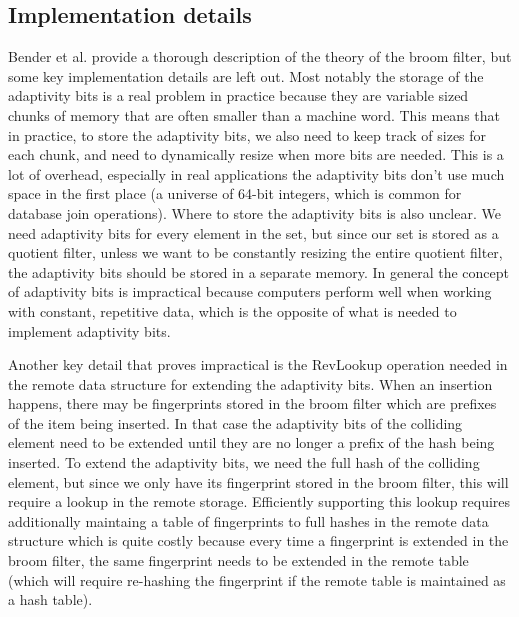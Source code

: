 \documentclass[../paper.tex]{subfiles}
\begin{document}
\subsection{Implementation details}

Bender et al. \cite{broom-filter} provide a thorough description of the theory of
the broom filter, but some key implementation details are left out.
Most notably the storage of the adaptivity bits is a real problem
in practice because they are variable sized chunks of memory that
are often smaller than a machine word. This means that in practice,
to store the adaptivity bits, we also need to keep track of sizes
for each chunk, and need to dynamically resize when more bits are needed.
This is a lot of overhead, especially in real applications the adaptivity
bits don't use much space in the first place (a universe of 64-bit integers,
which is common for database join operations). Where to store the adaptivity
bits is also unclear. We need adaptivity bits for every element in
the set, but since our set is stored as a quotient filter, unless
we want to be constantly resizing the entire quotient filter, the
adaptivity bits should be stored in a separate memory. In general
the concept of adaptivity bits is impractical because computers perform
well when working with constant, repetitive data, which is the opposite
of what is needed to implement adaptivity bits.

Another key detail that proves impractical is the RevLookup operation
needed in the remote data structure for extending the adaptivity bits. When
an insertion happens, there may be fingerprints stored in the broom filter
which are prefixes of the item being inserted. In that case the adaptivity
bits of the colliding element need to be extended until they are no longer
a prefix of the hash being inserted. To extend the adaptivity bits, we
need the full hash of the colliding element, but since we only have its
fingerprint stored in the broom filter, this will require a lookup in
the remote storage. Efficiently supporting this lookup requires additionally
maintaing a table of fingerprints to full hashes in the remote data structure
which is quite costly because every time a fingerprint is extended in the
broom filter, the same fingerprint needs to be extended in the remote table
(which will require re-hashing the fingerprint if the remote table is maintained
as a hash table).
\end{document}
